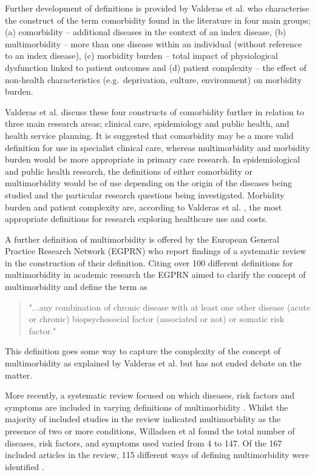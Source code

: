\documentclass[12pt,]{report}
\begin{document}
Further development of definitions is provided by Valderas et al.
\citep{RN64} who characterise the construct of the term comorbidity
found in the literature in four main groups; (a) comorbidity --
additional diseases in the context of an index disease, (b)
multimorbidity -- more than one disease within an individual (without
reference to an index disease), (c) morbidity burden -- total impact of
physiological dysfunction linked to patient outcomes and (d) patient
complexity -- the effect of non-health characteristics
(e.g.~deprivation, culture, environment) on morbidity burden.

Valderas et al. \citep{RN64} discuss these four constructs of
comorbidity further in relation to three main research areas; clinical
care, epidemiology and public health, and health service planning. It is
suggested that comorbidity may be a more valid definition for use in
specialist clinical care, whereas multimorbidity and morbidity burden
would be more appropriate in primary care research. In epidemiological
and public health research, the definitions of either comorbidity or
multimorbidity would be of use depending on the origin of the diseases
being studied and the particular research questions being investigated.
Morbidity burden and patient complexity are, according to Valderas et
al. \citep{RN64}, the most appropriate definitions for research
exploring healthcare use and costs.

A further definition of multimorbidity is offered by the European
General Practice Research Network (EGPRN) who report findings of a
systematic review in the construction of their definition. Citing over
100 different definitions for multimorbidity in academic research the
EGPRN \citep[pp.1]{RN77} aimed to clarify the concept of multimorbidity
and define the term as

\begin{quotation} "...any combination of chronic disease with at least one other disease (acute or chronic) biopsychosocial factor (associated or not) or somatic risk factor." \end{quotation}

This definition goes some way to capture the complexity of the concept
of multimorbidity as explained by Valderas et al. \citeyearpar{RN64} but
has not ended debate on the matter.

More recently, a systematic review focused on which diseases, risk
factors and symptoms are included in varying definitions of
multimorbidity \citep{RN254}. Whilst the majority of included studies in
the review indicated multimorbidity as the presence of two or more
conditions, Willadsen et al \citeyearpar{RN254} found the total number
of diseases, risk factors, and symptoms used varied from 4 to 147. Of
the 167 included articles in the review, 115 different ways of defining
multimorbidity were identified \citep{RN254}.
\end{document}
